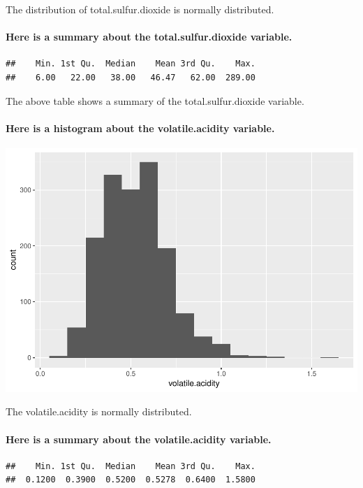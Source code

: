 \documentclass[]{article}
\let\oldparagraph\paragraph
\renewcommand{\paragraph}[1]{\oldparagraph{#1}\mbox{}}
\begin{document}
The distribution of total.sulfur.dioxide is normally distributed.

\paragraph{Here is a summary about the total.sulfur.dioxide
variable.}\label{here-is-a-summary-about-the-total.sulfur.dioxide-variable.}

\begin{verbatim}
##    Min. 1st Qu.  Median    Mean 3rd Qu.    Max. 
##    6.00   22.00   38.00   46.47   62.00  289.00
\end{verbatim}

The above table shows a summary of the total.sulfur.dioxide variable.

\paragraph{Here is a histogram about the volatile.acidity
variable.}\label{here-is-a-histogram-about-the-volatile.acidity-variable.}

\includegraphics{RedWine_files/figure-latex/Make_Plot_Function_For_volatile.acidity-1.pdf}

The volatile.acidity is normally distributed.

\paragraph{Here is a summary about the volatile.acidity
variable.}\label{here-is-a-summary-about-the-volatile.acidity-variable.}

\begin{verbatim}
##    Min. 1st Qu.  Median    Mean 3rd Qu.    Max. 
##  0.1200  0.3900  0.5200  0.5278  0.6400  1.5800
\end{verbatim}
\end{document}
